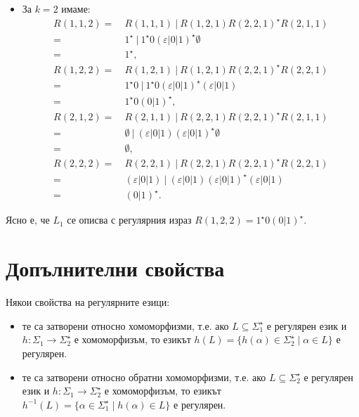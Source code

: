 \begin{example}
\begin{itemize}
\item
  За $k = 2$ имаме:
  \begin{align*}
    R(1,1,2) =\ & R(1,1,1)\ \vert\ R(1,2,1)R(2,2,1)^\star R(2,1,1) \\
    =\ & 1^\star\ \vert\ 1^\star0(\varepsilon\vert 0 \vert 1)^\star \emptyset \\
    =\ & 1^\star,\\
    R(1,2,2) =\ & R(1,2,1)\ \vert\ R(1,2,1)R(2,2,1)^\star R(2,2,1) \\
    =\ & 1^\star0\ \vert\ 1^\star0 (\varepsilon \vert 0 \vert 1)^\star (\varepsilon \vert 0 \vert 1) \\
    =\ & 1^\star 0 (0\vert 1)^\star,\\
    R(2,1,2) =\ & R(2,1,1)\ \vert\ R(2,2,1)R(2,2,1)^\star R(2,1,1) \\
    =\ & \emptyset\ \vert\ (\varepsilon\vert 0 \vert 1)(\varepsilon \vert 0 \vert 1)^\star \emptyset \\
    =\ & \emptyset,\\
    R(2,2,2) =\ & R(2,2,1)\ \vert\ R(2,2,1)R(2,2,1)^\star R(2,2,1) \\
    =\ & (\varepsilon\vert 0 \vert 1)\ \vert\ (\varepsilon\vert 0 \vert 1)(\varepsilon\vert 0 \vert 1)^\star(\varepsilon\vert 0 \vert 1)\\
    =\ & (0\vert 1)^\star.
  \end{align*}
\end{itemize}
Ясно е, че $L_1$ се описва с регулярния израз $R(1,2,2) = 1^\star 0 (0\vert 1)^\star$.
\end{example}

\section{Допълнителни свойства}

Някои свойства на регулярните езици:
\begin{itemize}
\item 
  те са затворени относно хомоморфизми, т.е.
  ако $L \subseteq \Sigma^\star_1$ е регулярен език и $h:\Sigma_1\to\Sigma^\star_2$ е хомоморфизъм, 
  то езикът $h(L) = \{h(\alpha) \in \Sigma^\star_2 \mid \alpha \in L\}$
  е регулярен.
\item
  те са затворени относно обратни хомоморфизми, т.е.
  ако $L\subseteq \Sigma^\star_2$ е регулярен език и $h:\Sigma_1\to\Sigma^\star_2$ е хомоморфизъм, 
  то езикът $h^{-1}(L) = \{\alpha \in \Sigma^\star_1 \mid h(\alpha) \in L\}$
  е регулярен.
\end{itemize}

